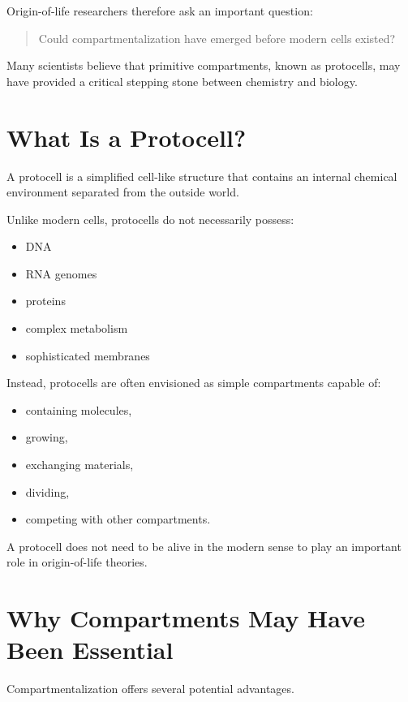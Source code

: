 \documentclass[
  oneside,
  openany]{book}
\providecommand{\tightlist}{%
  \setlength{\itemsep}{0pt}\setlength{\parskip}{0pt}}
\begin{document}
Origin-of-life researchers therefore ask an important question:

\begin{quote}
Could compartmentalization have emerged before modern cells existed?
\end{quote}

Many scientists believe that primitive compartments, known as protocells, may have provided a critical stepping stone between chemistry and biology.

\section{What Is a Protocell?}\label{what-is-a-protocell}

A protocell is a simplified cell-like structure that contains an internal chemical environment separated from the outside world.

Unlike modern cells, protocells do not necessarily possess:

\begin{itemize}
\tightlist
\item
  DNA
\item
  RNA genomes
\item
  proteins
\item
  complex metabolism
\item
  sophisticated membranes
\end{itemize}

Instead, protocells are often envisioned as simple compartments capable of:

\begin{itemize}
\tightlist
\item
  containing molecules,
\item
  growing,
\item
  exchanging materials,
\item
  dividing,
\item
  competing with other compartments.
\end{itemize}

A protocell does not need to be alive in the modern sense to play an important role in origin-of-life theories.

\section{Why Compartments May Have Been Essential}\label{why-compartments-may-have-been-essential}

Compartmentalization offers several potential advantages.
\end{document}
